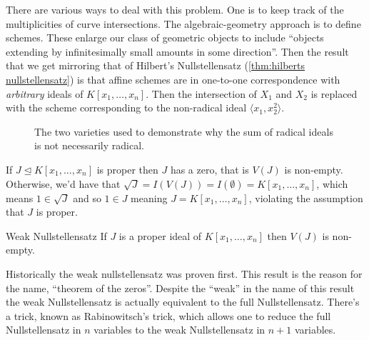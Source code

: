 \documentclass[fleqn]{NotesClass}
\newcommand{\subideal}{\trianglelefteq}
\begin{document}
\begin{remark}{}{}
        There are various ways to deal with this problem.
        One is to keep track of the multiplicities of curve intersections.
        The algebraic-geometry approach is to define schemes.
        These enlarge our class of geometric objects to include \enquote{objects extending by infinitesimally small amounts in some direction}.
        Then the result that we get mirroring that of Hilbert's Nullstellensatz (\cref{thm:hilberts nullstellensatz}) is that affine schemes are in one-to-one correspondence with \emph{arbitrary} ideals of \(K[x_1, \dotsc, x_n]\).
        Then the intersection of \(X_1\) and \(X_2\) is replaced with the scheme corresponding to the non-radical ideal \(\langle x_1, x_2^2 \rangle\).
    \end{remark}
    
    \begin{figure}
        \centering
        \caption[Sum of radicals not radical]{The two varieties used to demonstrate why the sum of radical ideals is not necessarily radical.}
        \label{fig:sum radicals not radical}
    \end{figure}
    
    If \(J \subideal K[x_1, \dotsc, x_n]\) is proper then \(J\) has a zero, that is \(V(J)\) is non-empty.
    Otherwise, we'd have that \(\sqrt{J} = I(V(J)) = I(\emptyset) = K[x_1, \dotsc, x_n]\), which means \(1 \in \sqrt{J}\) and so \(1 \in J\) meaning \(J = K[x_1, \dotsc, x_n]\), violating the assumption that \(J\) is proper.
    
    \begin{prp}{Weak Nullstellensatz}{}
        If \(J\) is a proper ideal of \(K[x_1, \dotsc, x_n]\) then \(V(J)\) is non-empty.
    \end{prp}
    
    \begin{remark}{}{}
        Historically the weak nullstellensatz was proven first.
        This result is the reason for the name, \enquote{theorem of the zeros}.
        Despite the \enquote{weak} in the name of this result the weak Nullstellensatz is actually equivalent to the full Nullstellensatz.
        There's a trick, known as Rabinowitsch's trick, which allows one to reduce the full Nullstellensatz in \(n\) variables to the weak Nullstellensatz in \(n + 1\) variables.
    \end{remark}
    
\end{document}

